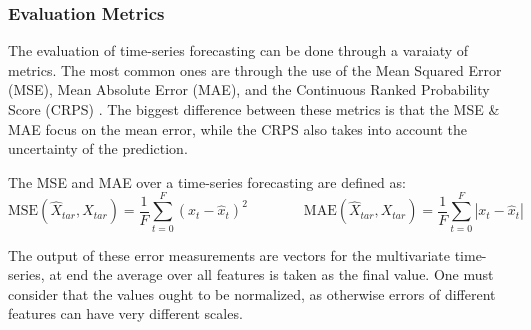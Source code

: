 \subsubsection{Evaluation Metrics} \label{sec:time-series_evaluation_metric}
The evaluation of time-series forecasting can be done through a varaiaty of metrics. The most common ones are through the use of the Mean Squared Error (MSE), Mean Absolute Error (MAE), and the Continuous Ranked Probability Score (CRPS) \cite{winkler_scoring_1996}. The biggest difference between these metrics is that the MSE \& MAE focus on the mean error, while the CRPS also takes into account the uncertainty of the prediction. 

The MSE and MAE over a time-series forecasting are defined as:
\begin{equation} \label{eq:mse}
    \text{MSE}(\hat{X}_{tar}, X_{tar}) = \frac{1}{F} \sum\limits_{t=0}^{F} (x_t - \hat{x}_t)^2
    \qquad \qquad
    \text{MAE}(\hat{X}_{tar}, X_{tar}) = \frac{1}{F}\sum_{t=0}^{F} \left| x_t - \hat{x}_t \right|
\end{equation}


The output of these error measurements are vectors for the multivariate time-series, at end the average over all features is taken as the final value. One must consider that the values ought to be normalized, as otherwise errors of different features can have very different scales.

